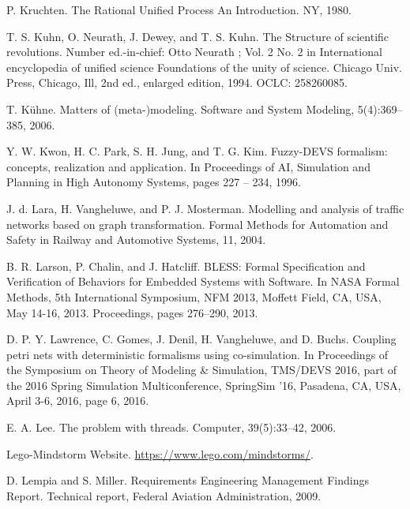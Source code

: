 \begin{description}[style=nextline,leftmargin=12mm,labelwidth=10mm,font=\normalfont]
\item[{[174]}] P. Kruchten. The Rational Unified Process An Introduction. NY, 1980.

\item[{[175]}] T. S. Kuhn, O. Neurath, J. Dewey, and T. S. Kuhn. The Structure of scientific revolutions. Number ed.-in-chief: Otto Neurath ; Vol. 2 No. 2 in International encyclopedia of unified science Foundations of the unity of science. Chicago Univ. Press, Chicago, Ill, 2nd ed., enlarged edition, 1994. OCLC: 258260085.

\item[{[176]}] T. Kühne. Matters of (meta-)modeling. Software and System Modeling, 5(4):369–385, 2006.

\item[{[177]}] Y. W. Kwon, H. C. Park, S. H. Jung, and T. G. Kim. Fuzzy-DEVS formalism: concepts, realization and application. In Proceedings of AI, Simulation and Planning in High Autonomy Systems, pages 227 – 234, 1996.

\item[{[178]}] J. d. Lara, H. Vangheluwe, and P. J. Mosterman. Modelling and analysis of traffic networks based on graph transformation. Formal Methods for Automation and Safety in Railway and Automotive Systems, 11, 2004.

\item[{[179]}] B. R. Larson, P. Chalin, and J. Hatcliff. BLESS: Formal Specification and Verification of Behaviors for Embedded Systems with Software. In NASA Formal Methods, 5th International Symposium, NFM 2013, Moffett Field, CA, USA, May 14-16, 2013. Proceedings, pages 276–290, 2013.

\item[{[180]}] D. P. Y. Lawrence, C. Gomes, J. Denil, H. Vangheluwe, and D. Buchs. Coupling petri nets with deterministic formalisms using co-simulation. In Proceedings of the Symposium on Theory of Modeling \& Simulation, TMS/DEVS 2016, part of the 2016 Spring Simulation Multiconference, SpringSim ’16, Pasadena, CA, USA, April 3-6, 2016, page 6, 2016.

\item[{[181]}] E. A. Lee. The problem with threads. Computer, 39(5):33–42, 2006.

\item[{[182]}] Lego-Mindstorm Website. \url{https://www.lego.com/mindstorms/}.

\item[{[183]}] D. Lempia and S. Miller. Requirements Engineering Management Findings Report. Technical report, Federal Aviation Administration, 2009.


\end{description}
